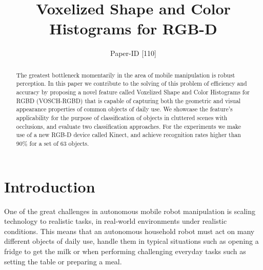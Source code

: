 \documentclass[conference]{sty/IEEEtran}
\begin{document}
\title{Voxelized Shape and Color Histograms for RGB-D}

\author{Paper-ID [110]}


\newcommand{\todo}[1]{\textbf{\textcolor{red}{TODO: #1}}}
\maketitle

\begin{abstract}
The greatest bottleneck momentarily in the area of mobile manipulation is robust perception.
In this paper we contribute to the solving of this problem of efficiency and accuracy
by proposing a novel feature called Voxelized Shape and Color Histograms for RGBD 
(VOSCH-RGBD) that is capable of capturing both the geometric and visual appearance
properties of common objects of daily use. We showcase the
feature's applicability for the purpose of classification of objects in cluttered scenes with occlusions,
and evaluate two classification approaches.
For the experiments we make use of a new RGB-D device called Kinect, and achieve recognition
rates higher than 90\% for a set of 63 objects.
\end{abstract}

\IEEEpeerreviewmaketitle

\section{Introduction}
One of the great challenges in autonomous mobile robot manipulation is scaling
technology to realistic tasks, in real-world environments under realistic
conditions. This means that an autonomous household robot must act on many
different objects of daily use, handle them in typical situations such as
opening a fridge to get the milk or when performing challenging everyday tasks
such as setting the table or preparing a meal.
\end{document}
